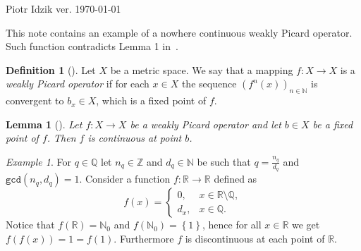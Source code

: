 \documentclass[12pt]{article}
\newcommand{\R}{\mathbb{R}}
\newcommand{\Q}{\mathbb{Q}}
\newcommand{\Z}{\mathbb{Z}}
\newcommand{\N}{\mathbb{N}}
\newcommand{\define}[1]{\textit{#1}}
\newcommand{\paren}[1]{\! \left(#1 \right)}
\newcommand{\set}[1]{\! \left\{#1 \right\}}
\renewcommand{\gcd}{\mathtt{gcd}}
\theoremstyle{plain}
\newtheorem{lemma}[theorem]{Lemma}
\theoremstyle{definition}
\newtheorem{definition}[theorem]{Definition}
\theoremstyle{remark}
\newtheorem{example}[theorem]{Example}
\begin{document}
\noindent Piotr Idzik \hfill ver. \today\ \currenttime{}

\vspace*{1cm}
This note contains an example of a nowhere continuous weakly Picard operator.
Such function contradicts Lemma 1 in~\cite{VasileBerinde2011}.

\begin{definition}[{{\cite[Definition 2]{VasileBerinde2011}}}]
    Let $X$ be a metric space.
    We say that a mapping $f \colon X \to X$ is a \define{weakly Picard operator} if
    for each $x \in X$ the sequence $\paren{f^n\paren{x}}_{n \in \N}$
    is convergent to $b_x \in X$, which is a fixed point of $f$.
\end{definition}

\begin{lemma}[{{\cite[Lemma 1]{VasileBerinde2011}}}]
    Let $f \colon X \to X$ be a weakly Picard operator and let $b \in X$ be a fixed point of $f$.
    Then $f$ is continuous at point $b$.
\end{lemma}

\begin{example}
    For $q \in \Q$ let $n_q \in \Z$ and $d_q \in \N$ be such that $q = \frac{n_q}{d_q}$ and $\gcd\paren{n_q, d_q} = 1$.
    Consider a function $f \colon \R \to \R$ defined as
    \begin{equation*}
        f(x) = \left\{ \begin{array}{ll}
            0, & x \in \R \setminus \Q,\\
            d_x, & x \in \Q.
               \end{array} \right.
    \end{equation*}
    Notice that $f(\R) = \N_0$ and $f(\N_0) = \set{1}$, hence for all $x \in \R$ we get $f\paren{f\paren{x}} = 1 = f\paren{1}$.
    Furthermore $f$ is discontinuous at each point of $\R$.
\end{example}

{}

\end{document}
